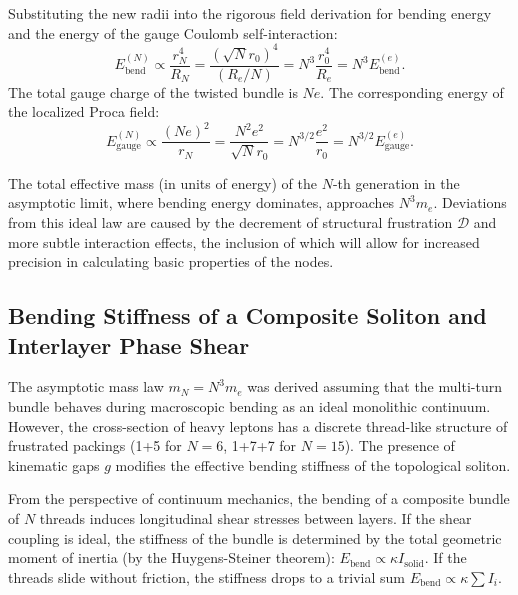 \documentclass[11pt,a4paper]{article}
\begin{document}
	Substituting the new radii into the rigorous field derivation for bending energy and the energy of the gauge Coulomb self-interaction:
	\begin{equation}
		E_{\text{bend}}^{(N)} \propto \frac{r_N^4}{R_N} = \frac{(\sqrt{N} r_0)^4}{(R_e / N)} = N^3 \frac{r_0^4}{R_e} = N^3 E_{\text{bend}}^{(e)}.
	\end{equation}
	The total gauge charge of the twisted bundle is $N e$. The corresponding energy of the localized Proca field:
	\begin{equation}
		E_{\text{gauge}}^{(N)} \propto \frac{(Ne)^2}{r_N} = \frac{N^2 e^2}{\sqrt{N} r_0} = N^{3/2} \frac{e^2}{r_0} = N^{3/2} E_{\text{gauge}}^{(e)}.
	\end{equation}
	
	The total effective mass (in units of energy) of the $N$-th generation in the asymptotic limit, where bending energy dominates, approaches $N^3 m_e$. Deviations from this ideal law are caused by the decrement of structural frustration $\mathcal{D}$ and more subtle interaction effects, the inclusion of which will allow for increased precision in calculating basic properties of the nodes.
	
\subsection{Bending Stiffness of a Composite Soliton and Interlayer Phase Shear}
	The asymptotic mass law $m_N = N^3 m_e$ was derived assuming that the multi-turn bundle behaves during macroscopic bending as an ideal monolithic continuum. However, the cross-section of heavy leptons has a discrete thread-like structure of frustrated packings (1+5 for $N=6$, 1+7+7 for $N=15$). The presence of kinematic gaps $g$ modifies the effective bending stiffness of the topological soliton.
	
	From the perspective of continuum mechanics, the bending of a composite bundle of $N$ threads induces longitudinal shear stresses between layers. If the shear coupling is ideal, the stiffness of the bundle is determined by the total geometric moment of inertia (by the Huygens-Steiner theorem): $E_{\text{bend}} \propto \kappa I_{\text{solid}}$. If the threads slide without friction, the stiffness drops to a trivial sum $E_{\text{bend}} \propto \kappa \sum I_i$.
	
\end{document}
